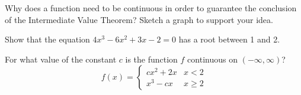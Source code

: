 \documentclass[notes]{subfiles}
\begin{document}
		\begin{question}
			Why does a function need to be continuous in order to guarantee the conclusion of the Intermediate Value Theorem?  Sketch a graph to support your idea.
		\end{question}
			\newpage
			
		\begin{ex}
			Show that the equation $4x^3-6x^2+3x-2 = 0$ has a root between 1 and 2.
		\end{ex}
			
		\begin{ex}
			For what value of the constant $c$ is the function $f$ continuous on $(-\infty,\infty)$?
			\[f(x) = \begin{cases} cx^2+2x & x < 2 \\ x^3-cx & x\geq 2\end{cases}\]
		\end{ex}
			\newpage
			
\end{document}
